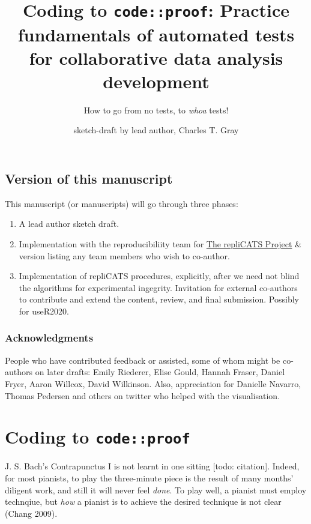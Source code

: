 \documentclass[
]{article}
\title{Coding to \texttt{code::proof}: Practice fundamentals of
automated tests for collaborative data analysis development}
\subtitle{How to go from no tests, to \emph{whoa} tests!}
\author{sketch-draft by lead author, Charles T. Gray}
\date{}
\providecommand{\tightlist}{%
  \setlength{\itemsep}{0pt}\setlength{\parskip}{0pt}}
\begin{document}
\maketitle

\hypertarget{version-of-this-manuscript}{%
\subsection{Version of this
manuscript}\label{version-of-this-manuscript}}

This manuscript (or manuscripts) will go through three phases:

\begin{enumerate}
\def\labelenumi{\arabic{enumi}.}
\tightlist
\item
  A lead author sketch draft.
\item
  Implementation with the reproducibiliity team for
  \href{https://replicats.research.unimelb.edu.au/}{The repliCATS
  Project} \& version listing any team members who wish to co-author.
\item
  Implementation of repliCATS procedures, explicitly, after we need not
  blind the algorithms for experimental ingegrity. Invitation for
  external co-authors to contribute and extend the content, review, and
  final submission. Possibly for useR2020.
\end{enumerate}

\hypertarget{acknowledgments}{%
\subsubsection{Acknowledgments}\label{acknowledgments}}

People who have contributed feedback or assisted, some of whom might be
co-authors on later drafts: Emily Riederer, Elise Gould, Hannah Fraser,
Daniel Fryer, Aaron Willcox, David Wilkinson. Also, appreciation for
Danielle Navarro, Thomas Pedersen and others on twitter who helped with
the visualisation.

\hypertarget{coding-to-codeproof}{%
\section{\texorpdfstring{Coding to
\texttt{code::proof}}{Coding to code::proof}}\label{coding-to-codeproof}}

J. S. Bach's Contrapunctus I is not learnt in one sitting {[}todo:
citation{]}. Indeed, for most pianists, to play the three-minute piece
is the result of many months' diligent work, and still it will never
feel \emph{done}. To play well, a pianist must employ technqiue, but
\emph{how} a pianist is to achieve the desired technique is not clear
(Chang 2009).
\end{document}

